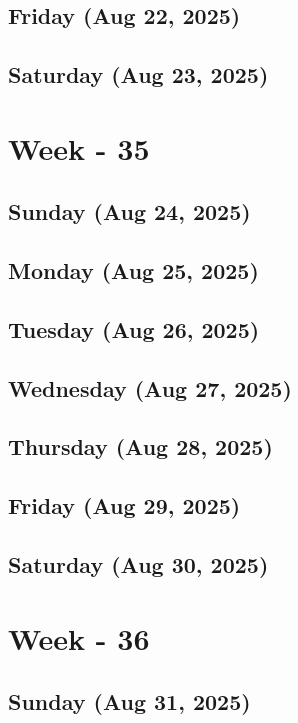 \subsection*{Friday (Aug 22, 2025)}
\subsection*{Saturday (Aug 23, 2025)}

\section{Week - 35}
\subsection*{Sunday (Aug 24, 2025)}
\subsection*{Monday (Aug 25, 2025)}
\subsection*{Tuesday (Aug 26, 2025)}
\subsection*{Wednesday (Aug 27, 2025)}
\subsection*{Thursday (Aug 28, 2025)}
\subsection*{Friday (Aug 29, 2025)}
\subsection*{Saturday (Aug 30, 2025)}

\section{Week - 36}
\subsection*{Sunday (Aug 31, 2025)}

\newpage
\begin{spacing}{1.0}
\renewcommand{\bibname}{\bf{References}}


\end{spacing}
